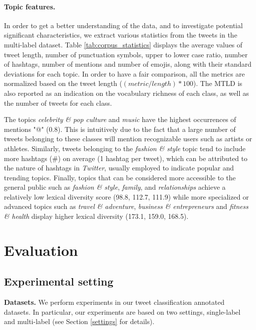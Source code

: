 \paragraph{Topic features.} In order to get a better understanding of the data, and to investigate potential significant characteristics, we extract various statistics from the tweets in the multi-label dataset. Table \ref{tab:corpus_statistics} displays the average values of tweet length, number of punctuation symbols, upper to lower case ratio, number of hashtags, number of mentions and number of emojis, along with their standard deviations for each topic. In order to have a fair comparison, all the metrics are normalized based on the tweet length ($(metric/length) * 100$). 
The \ac{MTLD} \cite{mccarthy2010mtld} is also reported as an indication on the vocabulary richness of each class, as well as the number of tweets for each class. 

The topics \textit{celebrity \& pop culture} and \textit{music} have the highest occurrences of mentions "@" (0.8). This is intuitively due to the fact that a large number of tweets belonging to these classes will mention recognizable users such as artists or athletes. Similarly, tweets belonging to the \textit{fashion \& style} topic tend to include more hashtags (\#) on average (1 hashtag per tweet), which can be attributed to the nature of hashtags in \textit{Twitter}, usually employed to indicate popular and trending topics. %
Finally, topics that can be considered more accessible to the general public such as \textit{fashion \& style}, \textit{family}, and \textit{relationships} achieve a relatively low lexical diversity score (98.8, 112.7, 111.9) while more specialized or advanced topics such as \textit{travel \& adventure}, \textit{business \& entrepreneurs} and \textit{fitness \& health} display higher lexical diversity (173.1, 159.0, 168.5).

\section{Evaluation}\label{evaluation}

\subsection{Experimental setting}
\noindent \textbf{Datasets.} We perform experiments in our tweet classification annotated datasets. In particular, our experiments are based on two settings, single-label and multi-label (see Section \ref{settings} for details).

